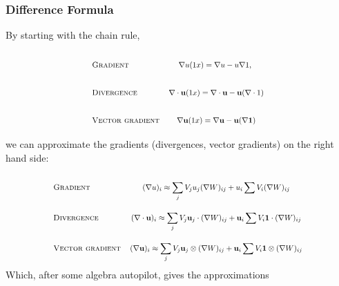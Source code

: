 \subsubsection*{Difference Formula}
By starting with the chain rule,
\begin{equation*}
\def\arraystretch{3}
\scalebox{.8}{%
\begin{tabular}{lc}
    \sc Gradient   & $\nabla u(1x) = \nabla u - u \nabla 1 \text{, } $ \\
    \sc Divergence & $\nabla \cdot \vec u(1x) = \nabla \cdot \vec u - \vec u (\nabla \cdot 1) $ \\
    \sc Vector gradient & $\nabla \vec u(1x) = \nabla \vec u - \vec u (\nabla \vec 1) $
\end{tabular}
}
\end{equation*}
we can approximate the gradients (divergences, vector gradients) on the right hand side:
\begin{equation*}
\def\arraystretch{3}
\scalebox{.8}{%
\begin{tabular}{lc}
    \sc Gradient & $\displaystyle
        (\nabla u)_i \approx
            \sum_j V_j u_j (\nabla W)_{ij}
      + u_i \sum V_i (\nabla W)_{ij} $ \\
    \sc Divergence & $\displaystyle
        (\nabla \cdot \vec u)_i \approx
            \sum_j V_j \vec u_j \cdot (\nabla W)_{ij}
      + \vec u_i \sum V_i \vec 1 \cdot (\nabla W)_{ij} $ \\
    \sc Vector gradient & $\displaystyle
        (\nabla \vec u)_i \approx
            \sum_j V_j \vec u_j \otimes (\nabla W)_{ij}
      + \vec u_i \sum V_i \vec{1} \otimes (\nabla W)_{ij} $
\end{tabular}
}
\end{equation*}
Which, after some algebra autopilot, gives the approximations

